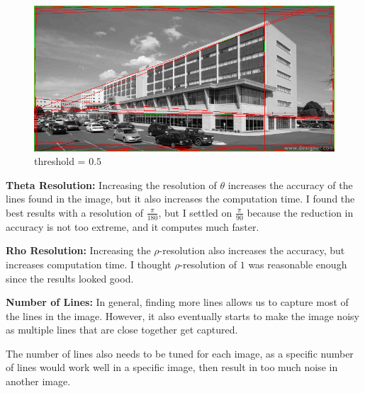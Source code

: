 \begin{enumroman}
\begin{figure}[h]
\begin{minipage}{0.4\textwidth}
        \label{fig:threshold-0.3}
      \end{minipage}
      \begin{minipage}{0.4\textwidth}
        \includegraphics[width=\textwidth]{images/09-threshold-0.5.png}
        \caption{threshold = $0.5$}
        \label{fig:threshold-0.5}
      \end{minipage}
    \end{figure}
  \item \textbf{Theta Resolution:}
    Increasing the resolution of $\theta$ increases the accuracy
    of the lines found in the image, but it also increases the
    computation time. I found the best results with a resolution
    of $\frac{\pi}{180}$, but I settled on $\frac{\pi}{90}$
    because the reduction in accuracy is not too extreme,
    and it computes much faster.

  \item \textbf{Rho Resolution:}
    Increasing the $\rho$-resolution also increases the accuracy,
    but increases computation time.
    I thought $\rho$-resolution of $1$ was reasonable enough since
    the results looked good.

  \item \textbf{Number of Lines:}
    In general, finding more lines allows us to capture most of the lines
    in the image. However, it also eventually starts to make the image
    noisy as multiple lines that are close together get captured.

    The number of lines also needs to be tuned for each image,
    as a specific number of lines would work well in a specific image,
    then result in too much noise in another image.


\end{enumroman}
